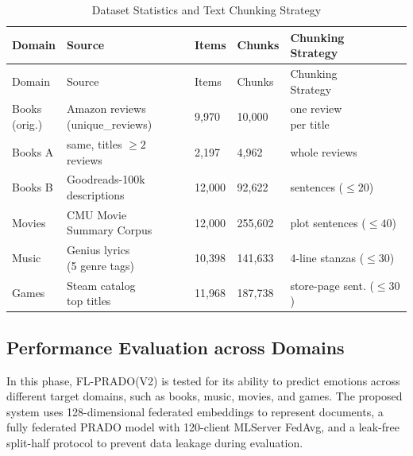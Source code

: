 \setlength{\tabcolsep}{4pt}
{\footnotesize
\begin{longtable}{|p{1.8cm}|p{3cm}|p{1.5cm}|p{1.5cm}|p{3cm}|}
\caption{Dataset Statistics and Text Chunking Strategy}
\label{tab:ch5_t1} \\
\hline
Domain & Source & Items & Chunks & \makecell{Chunking \\ Strategy} \\
\hline
\endfirsthead
\hline
Domain & Source & Items & Chunks & \makecell{Chunking \\ Strategy} \\
\hline
\endhead
\hline
\endfoot
\makecell{Books \\ (orig.)} \cite{ref81} & \makecell{Amazon reviews \\ (unique\_reviews)} & 9,970 & 10,000 & \makecell{one review \\ per title} \\
\hline
Books A \cite{ref93} & \makecell{same, titles \\ $\geq 2$ reviews} & 2,197 & 4,962 & whole reviews \\
\hline
Books B \cite{ref94} & \makecell{Goodreads-100k \\ descriptions} & 12,000 & 92,622 & \makecell{sentences \\ ($\leq 20$)} \\
\hline
Movies \cite{ref95} & \makecell{CMU Movie \\ Summary Corpus} & 12,000 & 255,602 & \makecell{plot sentences \\ ($\leq 40$)} \\
\hline
Music \cite{ref96} & \makecell{Genius lyrics \\ (5 genre tags)} & 10,398 & 141,633 & \makecell{4-line stanzas \\ ($\leq 30$)} \\
\hline
Games \cite{ref97} & \makecell{Steam catalog \\ top titles} & 11,968 & 187,738 & \makecell{store-page sent. \\ ($\leq 30$)} \\
\hline
\end{longtable}
\setlength{\tabcolsep}{6pt}
} %

\subsection{Performance Evaluation across Domains}
In this phase, FL-PRADO(V2) is tested for its ability to predict emotions across different target domains, such as books, music, movies, and games. The proposed system uses 128-dimensional federated embeddings to represent documents, a fully federated PRADO model with 120-client MLServer FedAvg, and a leak-free split-half protocol to prevent data leakage during evaluation.

